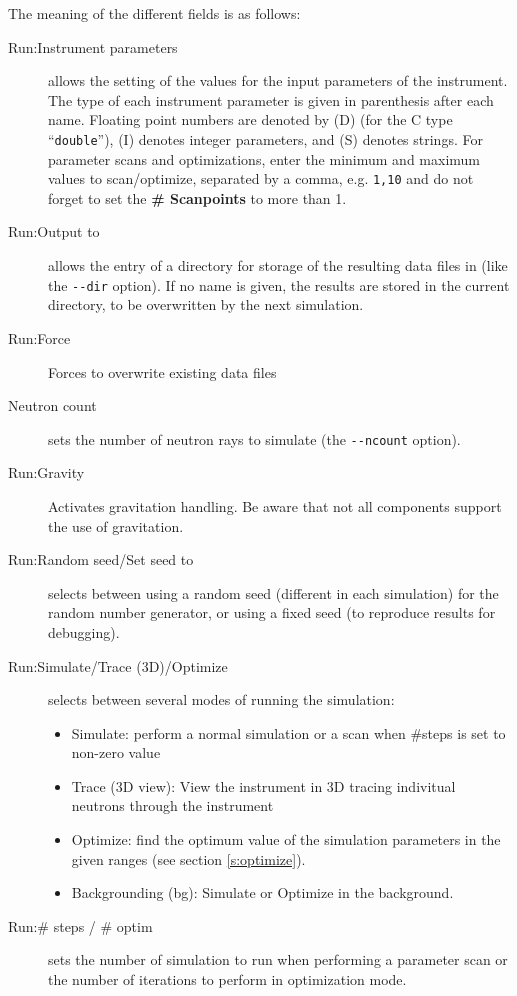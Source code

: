 The meaning of the different fields is as follows:
\begin{description}
\item[Run:Instrument parameters] allows the setting of the values for
  the input parameters of the instrument. The type of each instrument
  parameter is given in parenthesis after each name. Floating point
  numbers are denoted by (D) (for the C type ``\verb+double+''), (I)
  denotes integer parameters, and (S) denotes strings. For parameter scans and optimizations, enter the minimum and maximum values to scan/optimize, separated by a comma, e.g. \verb+1,10+ and do not forget to set the {\bf \# Scanpoints} to more than 1.
\item[Run:Output to] allows the entry of a directory for storage of the
  resulting data files in (like the \verb+--dir+ option). If no name is
  given, the results are stored in the current directory, to be overwritten
  by the next simulation.
\item[Run:Force] Forces to overwrite existing data files
\item[Neutron count] sets the number of neutron rays to
  simulate (the \verb+--ncount+ option).
\item[Run:Gravity] Activates gravitation handling. Be aware that not all
    components support the use of gravitation.
\item[Run:Random seed/Set seed to] selects between using a random seed (different
  in each simulation) for the random number generator, or using a fixed
  seed (to reproduce results for debugging).
\item[Run:Simulate/Trace (3D)/Optimize] selects between several modes of
  running the simulation:
  \begin{itemize}
  \item Simulate: perform a normal simulation or a scan when \#steps
    is set to non-zero value
  \item Trace (3D view): View the instrument in 3D tracing indivitual
    neutrons through the instrument
  \item Optimize: find the optimum value of the simulation parameters
    in the given ranges (see section \ref{s:optimize}).
  \item Backgrounding (bg): Simulate or Optimize in the background.
\end{itemize}
\item[Run:\# steps / \# optim] sets the number of simulation to run when
  performing a parameter scan or the number of iterations to
  perform in optimization mode.

\end{description}
